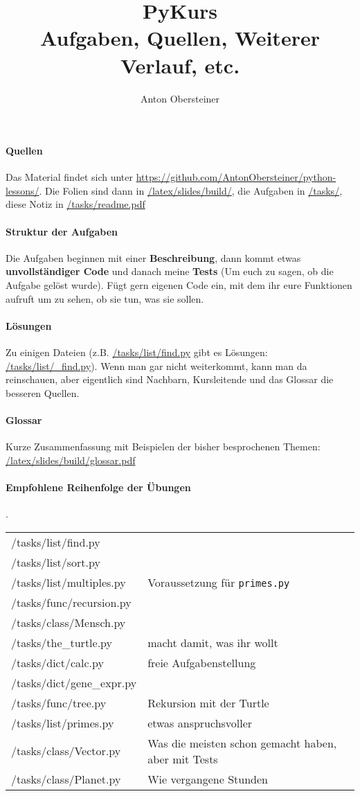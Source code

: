 \documentclass{article}
\title{PyKurs \\ \normalsize Aufgaben, Quellen, Weiterer Verlauf, etc.}
\author{Anton Obersteiner}
\begin{document}
\maketitle
\paragraph{Quellen}
	Das Material findet sich unter \url{https://github.com/AntonObersteiner/python-lessons/}.
	Die Folien sind dann in \url{/latex/slides/build/}, die Aufgaben in \url{/tasks/}, diese Notiz in \url{/tasks/readme.pdf}

\paragraph{Struktur der Aufgaben}
	Die Aufgaben beginnen mit einer \textbf{Beschreibung}, dann kommt etwas \textbf{unvollständiger Code} und danach meine \textbf{Tests} (Um euch zu sagen, ob die Aufgabe gelöst wurde). Fügt gern eigenen Code ein, mit dem ihr eure Funktionen aufruft um zu sehen, ob sie tun, was sie sollen.
\paragraph{Lösungen}
	Zu einigen Dateien (z.B. \url{/tasks/list/find.py} gibt es Lösungen: \url{/tasks/list/_find.py}). Wenn man gar nicht weiterkommt, kann man da reinschauen, aber eigentlich sind Nachbarn, Kursleitende und das Glossar die besseren Quellen.

\paragraph{Glossar}
	Kurze Zusammenfassung mit Beispielen der bisher besprochenen Themen: \url{/latex/slides/build/glossar.pdf}

\paragraph{Empfohlene Reihenfolge der Übungen} .\\
	\begin{tabular}{l|l}
		/tasks/list/find.py \\
		/tasks/list/sort.py \\
		/tasks/list/multiples.py & Voraussetzung für \texttt{primes.py} \\
		/tasks/func/recursion.py \\
		/tasks/class/Mensch.py \\
		/tasks/the\_turtle.py & macht damit, was ihr wollt \\
		/tasks/dict/calc.py & freie Aufgabenstellung \\
		/tasks/dict/gene\_expr.py \\
		/tasks/func/tree.py & Rekursion mit der Turtle \\
		/tasks/list/primes.py & etwas anspruchsvoller \\
		/tasks/class/Vector.py & Was die meisten schon gemacht haben, aber mit Tests \\
		/tasks/class/Planet.py & Wie vergangene Stunden \\
	\end{tabular}
\end{document}
